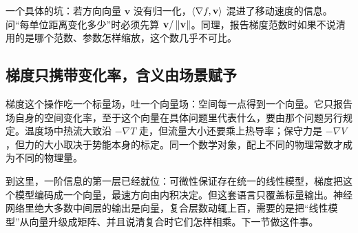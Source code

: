 \begin{remark}
一个具体的坑：若方向向量 \(\mathbf v\) 没有归一化，\(\left\langle\nabla f,\mathbf v\right\rangle\) 混进了移动速度的信息。问``每单位距离变化多少''时必须先算 \(\mathbf v/\left\lVert\mathbf v\right\rVert\)。同理，报告梯度范数时如果不说清用的是哪个范数、参数怎样缩放，这个数几乎不可比。
\end{remark}

\subsection{梯度只携带变化率，含义由场景赋予}

梯度这个操作吃一个标量场，吐一个向量场：空间每一点得到一个向量。它只报告场自身的空间变化率，至于这个向量在具体问题里代表什么，要由那个问题另行规定。温度场中热流大致沿 \(-\nabla T\) 走，但流量大小还要乘上热导率；保守力是 \(-\nabla V\)，但力的大小取决于势能本身的标定。同一个数学对象，配上不同的物理常数才成为不同的物理量。

到这里，一阶信息的第一层已经就位：可微性保证存在统一的线性模型，梯度把这个模型编码成一个向量，最速方向由内积决定。但这套语言只覆盖标量输出。神经网络里绝大多数中间层的输出是向量，复合层数动辄上百，需要的是把``线性模型''从向量升级成矩阵、并且说清复合时它们怎样相乘。下一节做这件事。
